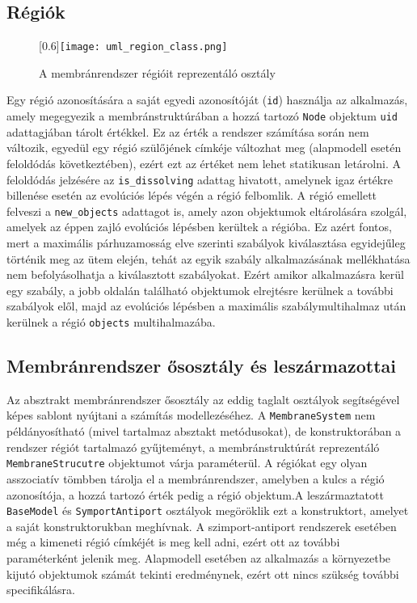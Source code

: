 \subsection{Régiók}

\begin{figure}[H]
\centering
	\scalebox{0.6}[0.6]{\texttt{[image: uml\_region\_class.png]}}
	\caption{A membránrendszer régióit reprezentáló osztály}
	\label{fig:region_uml}
\end{figure}

Egy régió azonosítására a saját egyedi azonosítóját (\verb|id|) használja az alkalmazás, amely megegyezik a membránstruktúrában a hozzá tartozó \verb|Node| objektum \verb|uid| adattagjában tárolt értékkel. Ez az érték a rendszer számítása során nem változik, egyedül egy régió szülőjének címkéje változhat meg (alapmodell esetén feloldódás következtében), ezért ezt az értéket nem lehet statikusan letárolni. A feloldódás jelzésére az \verb|is_dissolving| adattag hivatott, amelynek igaz értékre billenése esetén az evolúciós lépés végén a régió felbomlik. A régió emellett felveszi a \verb|new_objects| adattagot is, amely azon objektumok eltárolására szolgál, amelyek az éppen zajló evolúciós lépésben kerültek a régióba. Ez azért fontos, mert a maximális párhuzamosság elve szerinti szabályok kiválasztása egyidejűleg történik meg az ütem elején, tehát az egyik szabály alkalmazásának mellékhatása nem befolyásolhatja a kiválasztott szabályokat. Ezért amikor alkalmazásra kerül egy szabály, a jobb oldalán található objektumok elrejtésre kerülnek a további szabályok elől, majd az evolúciós lépésben a maximális szabálymultihalmaz után kerülnek a régió \verb|objects| multihalmazába. 

\subsection{Membránrendszer ősosztály és leszármazottai}

Az absztrakt membránrendszer ősosztály az eddig taglalt osztályok segítségével képes sablont nyújtani a számítás modellezéséhez. A \verb|MembraneSystem| nem példányosítható (mivel tartalmaz absztakt metódusokat), de konstruktorában a rendszer régiót tartalmazó gyűjteményt, a membránstruktúrát reprezentáló \verb|MembraneStrucutre| objektumot várja paraméterül. A régiókat egy olyan asszociatív tömbben tárolja el a membránrendszer, amelyben a kulcs a régió azonosítója, a hozzá tartozó érték pedig a régió objektum.A leszármaztatott \verb|BaseModel| és \verb|SymportAntiport| osztályok megöröklik ezt a konstruktort, amelyet a saját konstruktorukban meghívnak. A szimport-antiport rendszerek esetében még a kimeneti régió címkéjét is meg kell adni, ezért ott az további paraméterként jelenik meg. Alapmodell esetében az alkalmazás a környezetbe kijutó objektumok számát tekinti eredménynek, ezért ott nincs szükség további specifikálásra. 

